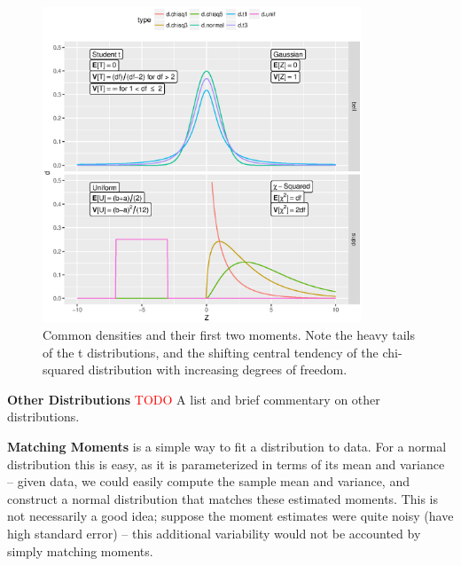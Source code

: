 \documentclass[../primer.tex]{subfiles}
\begin{document}
\begin{figure}[!ht]
  \centering
  \includegraphics[width=0.85\textwidth]{./images/dist_sheet}

  \caption{Common densities and their first two moments. Note the heavy tails of
    the t distributions, and the shifting central tendency of the chi-squared
    distribution with increasing degrees of freedom.}
  \label{fig:dist-sheet}
\end{figure}

\noindent\textbf{Other Distributions} \textcolor{red}{TODO} A list and brief
commentary on other distributions.

\noindent\textbf{Matching Moments} is a simple way to fit a distribution to
data. For a normal distribution this is easy, as it is parameterized in terms of
its mean and variance -- given data, we could easily compute the sample mean and
variance, and construct a normal distribution that matches these estimated
moments. This is not necessarily a good idea; suppose the moment estimates were
quite noisy (have high standard error) -- this additional variability would not
be accounted by simply matching moments.
\end{document}
